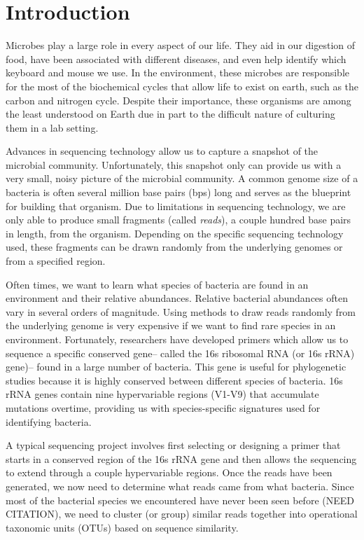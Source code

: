 \section{Introduction}

Microbes play a large role in every aspect of our life.
They aid in our digestion of food\cite{gill_metagenomic_2006}, have been associated with different diseases\cite{qin_metagenome-wide_2012}, and even help identify which keyboard and mouse we use\cite{fierer_forensic_2010}.
In the environment, these microbes are responsible for the most of the biochemical cycles that allow life to exist on earth, such as the carbon and nitrogen cycle\cite{venter_environmental_2004}.
Despite their importance, these organisms are among the least understood on Earth due in part to the difficult nature of culturing them in a lab setting.

Advances in sequencing technology allow us to capture a snapshot of the microbial community.
Unfortunately, this snapshot only can provide us with a very small, noisy picture of the microbial community.
A common genome size of a bacteria is often several million base pairs (bps) long and serves as the blueprint for building that organism.
Due to limitations in sequencing technology, we are only able to produce small fragments (called \emph{reads}), a couple hundred base pairs in length, from the organism.
Depending on the specific sequencing technology used, these fragments can be drawn randomly from the underlying genomes or from a specified region.

Often times, we want to learn what species of bacteria are found in an environment and their relative abundances.
Relative bacterial abundances often vary in several orders of magnitude.
Using methods to draw reads randomly from the underlying genome is very expensive if we want to find rare species in an environment.
Fortunately, researchers have developed primers which allow us to sequence a specific conserved gene-- called the 16s ribosomal RNA (or 16s rRNA) gene)-- found in a large number of bacteria.
This gene is useful for phylogenetic studies because it is highly conserved between different species of bacteria.
16s rRNA genes contain nine hypervariable regions (V1-V9) that accumulate mutations overtime, providing us with species-specific signatures used for identifying bacteria.

A typical sequencing project involves first selecting or designing a primer that starts in a conserved region of the 16s rRNA gene and then allows the sequencing to extend through a couple hypervariable regions.
Once the reads have been generated, we now need to determine what reads came from what bacteria.
Since most of the bacterial species we encountered have never been seen before (NEED CITATION), we need to cluster (or group) similar reads together into operational taxonomic units (OTUs) based on sequence similarity.

